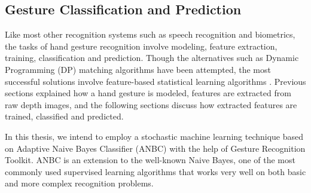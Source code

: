 

\subsection{Gesture Classification and Prediction} Like most other recognition systems such as speech recognition and biometrics, the tasks of hand gesture recognition involve modeling, feature extraction, training, classification and prediction. Though the alternatives such as Dynamic Programming (DP) matching algorithms have been attempted, the most successful solutions involve feature-based statistical learning algorithms \cite{23}. Previous sections explained how a hand gesture is modeled, features are extracted from raw depth images, and the following sections discuss how extracted features are trained, classified and predicted.

In this thesis, we intend to employ a stochastic machine learning technique based on Adaptive Naive Bayes Classifier (ANBC) with the help of Gesture Recognition Toolkit. ANBC is an extension to the well-known Naive Bayes, one of the most commonly used supervised learning algorithms that works very well on both basic and more complex recognition problems.

 
